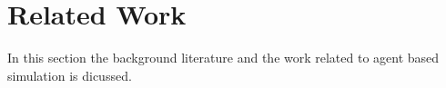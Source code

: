 \chapter{Related Work\label{ch:pastwork}}

In this section the background literature and the work related to agent based simulation is dicussed. 




